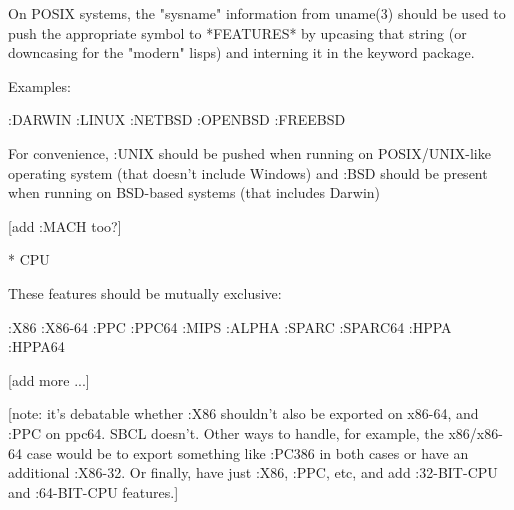 \documentclass[10pt,english]{book}
\begin{document}
On POSIX systems, the "sysname" information from uname(3) should be
used to push the appropriate symbol to *FEATURES* by upcasing that
string (or downcasing for the "modern" lisps) and interning it in the
keyword package.

Examples:

  :DARWIN
  :LINUX
  :NETBSD
  :OPENBSD
  :FREEBSD

For convenience, :UNIX should be pushed when running on
POSIX/UNIX-like operating system (that doesn't include Windows) and
:BSD should be present when running on BSD-based systems (that
includes Darwin)

[add :MACH too?]


* CPU

These features should be mutually exclusive:

  :X86
  :X86-64
  :PPC
  :PPC64
  :MIPS
  :ALPHA
  :SPARC
  :SPARC64
  :HPPA
  :HPPA64

[add more ...]

[note: it's debatable whether :X86 shouldn't also be exported on
x86-64, and :PPC on ppc64.  SBCL doesn't.  Other ways
to handle, for example, the x86/x86-64 case would be to export
something like :PC386 in both cases or have an additional :X86-32. Or
finally, have just :X86, :PPC, etc, and add :32-BIT-CPU and
:64-BIT-CPU features.]

\printindex



\end{document}
